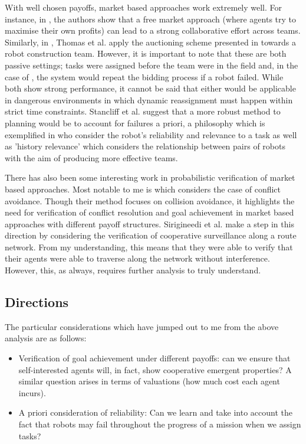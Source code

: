 \documentclass[preprint,11pt]{report}
\begin{document}
With well chosen payoffs, market based approaches work extremely well. For instance, in
\cite{Dias2000ASystem}, the authors show that a free market approach (where agents try to maximise
their own profits) can lead to a strong collaborative effort across teams. Similarly, in
\cite{Thomas2005Multi-robotScenarios}, Thomas et al. apply the auctioning scheme presented in
\cite{Gerkey2002Sold:Coordination} towards a robot construction team. However, it is important to
note that these are both passive settings; tasks were assigned before the team were in the field
and, in the case of \cite{Gerkey2002Sold:Coordination}, the system would repeat the bidding process
if a robot failed. While both show strong performance, it cannot be said that either would be
applicable in dangerous environments in which dynamic reassignment must happen within strict time
constraints. Stancliff et al. \cite{Stancliff2009PlanningAllocation} suggest that a more robust
method to planning would be to account for failures a priori, a philosophy which is exemplified in
\cite{Chen2010ACollaboration} who consider the robot's reliability and relevance to a task as well
as 'history relevance' which considers the relationship between pairs of robots with the aim of
producing more effective teams.

There has also been some interesting work in probabilistic verification of market based approaches.
Most notable to me is \cite{Pallottino2007ProbabilisticAvoidance} which considers the case of
conflict avoidance. Though their method focuses on collision avoidance, it highlights the need for
verification of conflict resolution and goal achievement in market based approaches with different
payoff structures. Sirigineedi et al. \cite{Sirigineedi2010DecentralisedApproach} make a step in
this direction by considering the verification of cooperative surveillance along a route network.
From my understanding, this means that they were able to verify that their agents were able to
traverse along the network without interference. However, this, as always, requires further analysis
to truly understand.

\subsection{Directions}

The particular considerations which have jumped out to me from the above analysis are as follows:

\begin{itemize} 
	\item Verification of goal achievement under different payoffs: can we ensure that
	self-interested agents will, in fact, show cooperative emergent properties? A similar question
	arises in terms of valuations (how much cost each agent incurs). 
	\item A priori consideration of
	reliability: Can we learn and take into account the fact that robots may fail throughout the
	progress of a mission when we assign tasks? 
\end{itemize}
\end{document}
